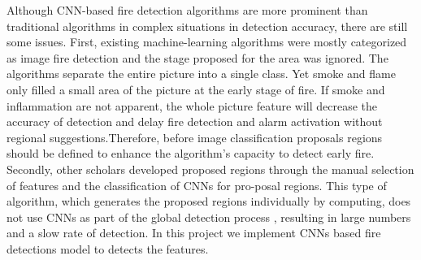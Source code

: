  Although CNN-based fire detection algorithms are more prominent 
 than traditional algorithms in complex situations in detection 
 accuracy, there are still some issues. First, existing 
 machine-learning algorithms were mostly categorized as 
 image fire detection and the stage proposed for the area was 
 ignored. The algorithms separate the entire picture into a 
 single class. Yet smoke and flame only filled a small area 
 of the picture at the early stage of fire. If smoke and 
 inflammation are not apparent, the whole picture feature will 
 decrease the accuracy of detection and delay fire detection 
 and alarm activation without regional suggestions.Therefore, 
 before image classification proposals regions should be defined 
 to enhance the algorithm's capacity to detect early fire. 
 Secondly, other scholars developed proposed regions through 
 the manual selection of features and the classification 
 of CNNs for pro-posal regions. This type of algorithm, which 
 generates the proposed regions individually by computing, 
 does not use CNNs as part of the global detection process , 
 resulting in large numbers and a slow rate of detection.
 In this project we implement CNNs based fire detections model to 
 detects the features.